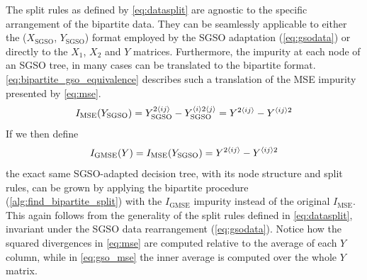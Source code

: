 The split rules as defined by \autoref{eq:datasplit} are agnostic to the specific arrangement of the bipartite data. They can be seamlessly applicable to either the ($X_\text{SGSO}$, $Y_\text{SGSO}$) format employed by the SGSO adaptation (\autoref{eq:gsodata}) or directly to the $X_1$, $X_2$ and $Y$ matrices.
Furthermore, the impurity at each node of an SGSO tree,
in many cases can be translated to the bipartite format. \autoref{eq:bipartite_gso_equivalence} describes such a translation of the MSE impurity presented by \autoref{eq:mse}.
%
\begin{equation}
    I_\text{MSE}(Y_\text{SGSO})
        = Y_\text{SGSO}^{2\langle ij\rangle} - Y_\text{SGSO}^{\langle i\rangle 2 \langle j\rangle}
        = Y^{2\langle ij\rangle} - Y^{\langle ij\rangle2}
    \label{eq:bipartite_gso_equivalence}
\end{equation}
% 
If we then define
%
\begin{equation}
    I_\text{GMSE}(Y) = I_\text{MSE}(Y_\text{SGSO})
        = Y^{2\langle ij\rangle} - Y^{\langle ij\rangle2}
    \label{eq:gso_mse}
\end{equation}
%
the exact same SGSO-adapted decision tree, with its node structure and split rules, can be grown by applying the bipartite procedure (\autoref{alg:find_bipartite_split}) with the $I_\text{GMSE}$ impurity instead of the original $I_\text{MSE}$. This again follows from the generality of the split rules defined in \autoref{eq:datasplit}, invariant under the SGSO data rearrangement (\autoref{eq:gsodata}).
%
%
Notice how the squared divergences in \ref{eq:mse} are computed relative to the average of each $Y$ column, while in \ref{eq:gso_mse} the inner average is computed over the whole $Y$ matrix.  %

